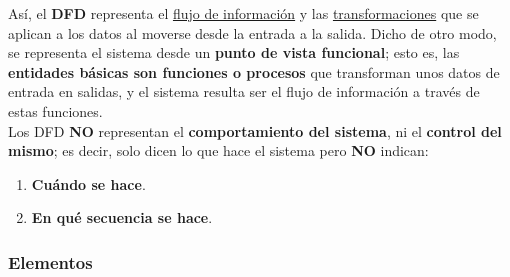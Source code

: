 Así, el \textbf{DFD} representa el \uline{flujo de información} y las \uline{transformaciones} que se aplican a los datos al moverse desde la entrada a la salida. Dicho de otro modo, se representa el sistema desde un \textbf{punto de vista funcional}; esto es, las \textbf{entidades básicas son funciones o procesos} que transforman unos datos de entrada en salidas, y el sistema resulta ser el flujo de información a través de estas funciones.\\

Los DFD \textbf{NO} representan el \textbf{comportamiento del sistema}, ni el \textbf{control del mismo}; es decir, solo dicen lo que hace el sistema pero \textbf{NO} indican:

\begin{enumerate}
    \item \textbf{Cuándo se hace}.
    \item \textbf{En qué secuencia se hace}.
\end{enumerate}

\subsubsection{Elementos}

